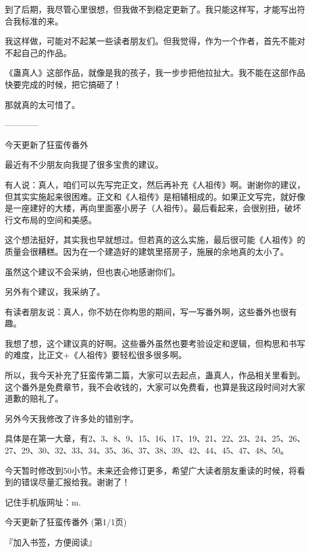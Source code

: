 \begin{this_body}
到了后期，我尽管心里很想，但我做不到稳定更新了。我只能这样写，才能写出符合我标准的来。

我这样做，可能对不起某一些读者朋友们。但我觉得，作为一个作者，首先不能对不起自己的作品。

《蛊真人》这部作品，就像是我的孩子，我一步步把他拉扯大。我不能在这部作品快要完成的时候，把它搞砸了！

那就真的太可惜了。

------------

今天更新了狂蛮传番外

最近有不少朋友向我提了很多宝贵的建议。

有人说：真人，咱们可以先写完正文，然后再补充《人祖传》啊。谢谢你的建议，但其实实施起来很困难。正文和《人祖传》是相辅相成的。如果正文写完，就好像是一座建好的大楼，再向里面塞小房子（人祖传）。最后看起来，会很别扭，破坏行文布局的空间和美感。

这个想法挺好，其实我也早就想过。但若真的这么实施，最后很可能《人祖传》的质量会很糟糕。因为在一个建造好的建筑里搭房子，施展的余地真的太小了。

虽然这个建议不会采纳，但也衷心地感谢你们。

另外有个建议，我采纳了。

有读者朋友说：真人，你不妨在你构思的期间，写一写番外啊，这些番外也很有趣。

我想了想，这个建议真的好啊。这些番外虽然也要考验设定和逻辑，但构思和书写的难度，比正文+《人祖传》要轻松很多很多啊。

所以，我今天补充了狂蛮传第二篇，大家可以去起点，蛊真人，作品相关里看到。这个番外是免费章节，我不会收钱的，大家可以免费看，也算是我这段时间对大家道歉的赔礼了。

另外今天我修改了许多处的错别字。

具体是在第一大章，有2、3、8、9、15、16、17、19、21、22、23、24、25、26、27、29、30、32、33、34、35、36、37、38、39、42、44、45、47、48、50。

今天暂时修改到50小节。未来还会修订更多，希望广大读者朋友重读的时候，将看到的错误尽量汇报给我。谢谢了！

记住手机版网址：m.

今天更新了狂蛮传番外 (第1/1页)

『加入书签，方便阅读』

\end{this_body}

